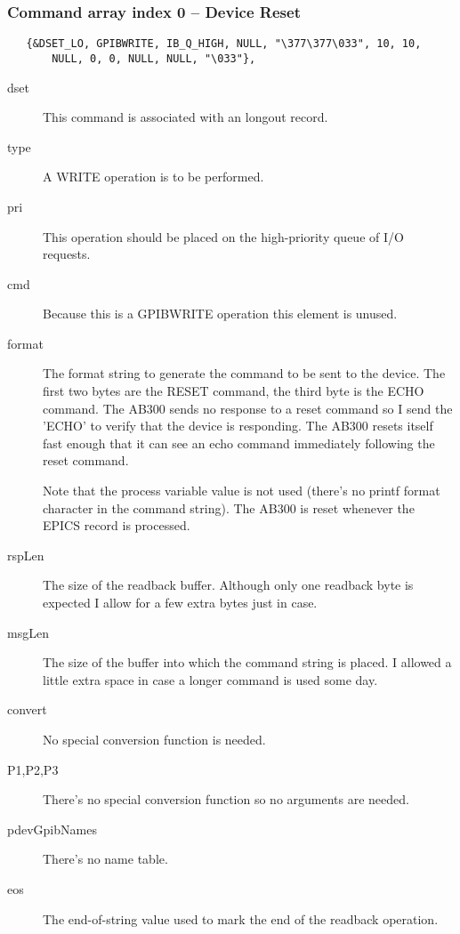 \documentclass[twoside]{article}
\begin{document}
\subsubsection{Command array index 0 -- Device Reset}
\begin{verbatim}
   {&DSET_LO, GPIBWRITE, IB_Q_HIGH, NULL, "\377\377\033", 10, 10,
       NULL, 0, 0, NULL, NULL, "\033"},
\end{verbatim}
\begin{description}
\item[dset] This command is associated with an longout record.
\item[type] A WRITE operation is to be performed.
\item[pri] This operation should be placed on the high-priority queue
of I/O requests.
\item[cmd] Because this is a GPIBWRITE operation this element is unused.
\item[format] The format string to generate the command to be sent to the device.  The first two bytes are
the RESET command, the third byte is the ECHO command.
The AB300 sends no response to a reset command
so I send the 'ECHO' to verify that the
device is responding.  The AB300 resets itself fast enough that it can see an
echo command immediately following the reset command.

Note that the process variable value is not used (there's no printf \verb@%@
format character in the command string).  The AB300 is reset whenever the
EPICS record is processed.
\item[rspLen] The size of the readback buffer.  Although only one readback byte is
expected I allow for a few extra bytes just in case.
\item[msgLen] The size of the buffer into which the command string is placed.  I allowed
a little extra space in case a longer command is used some day.
\item[convert] No special conversion function is needed.
\item[P1,P2,P3] There's no special conversion function so no arguments are needed.
\item[pdevGpibNames] There's no name table.
\item[eos] The end-of-string value used to mark the end of the readback operation.
\end{description}
\end{document}
